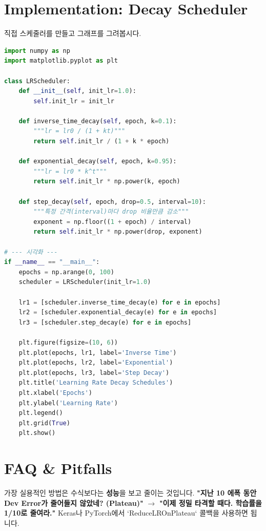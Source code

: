 \documentclass[11pt,a4paper]{book}
\theoremstyle{definition}
\begin{document}
\section{Implementation: Decay Scheduler}

직접 스케줄러를 만들고 그래프를 그려봅시다.

\begin{lstlisting}[language=Python, caption=Learning Rate Schedulers, breaklines=true]
import numpy as np
import matplotlib.pyplot as plt

class LRScheduler:
    def __init__(self, init_lr=1.0):
        self.init_lr = init_lr
        
    def inverse_time_decay(self, epoch, k=0.1):
        """lr = lr0 / (1 + kt)"""
        return self.init_lr / (1 + k * epoch)
        
    def exponential_decay(self, epoch, k=0.95):
        """lr = lr0 * k^t"""
        return self.init_lr * np.power(k, epoch)
        
    def step_decay(self, epoch, drop=0.5, interval=10):
        """특정 간격(interval)마다 drop 비율만큼 감소"""
        exponent = np.floor((1 + epoch) / interval)
        return self.init_lr * np.power(drop, exponent)

# --- 시각화 ---
if __name__ == "__main__":
    epochs = np.arange(0, 100)
    scheduler = LRScheduler(init_lr=1.0)
    
    lr1 = [scheduler.inverse_time_decay(e) for e in epochs]
    lr2 = [scheduler.exponential_decay(e) for e in epochs]
    lr3 = [scheduler.step_decay(e) for e in epochs]
    
    plt.figure(figsize=(10, 6))
    plt.plot(epochs, lr1, label='Inverse Time')
    plt.plot(epochs, lr2, label='Exponential')
    plt.plot(epochs, lr3, label='Step Decay')
    plt.title('Learning Rate Decay Schedules')
    plt.xlabel('Epochs')
    plt.ylabel('Learning Rate')
    plt.legend()
    plt.grid(True)
    plt.show()
\end{lstlisting}

\section{FAQ \& Pitfalls}

\begin{tipbox}[title={ReduceLROnPlateau (실전 꿀팁)}]
가장 실용적인 방법은 수식보다는 \textbf{성능}을 보고 줄이는 것입니다.
\textbf{"지난 10 에폭 동안 Dev Error가 줄어들지 않았네? (Plateau)"} $\rightarrow$ \textbf{"이제 정밀 타격할 때다. 학습률을 1/10로 줄여라."}
Keras나 PyTorch에서 `ReduceLROnPlateau` 콜백을 사용하면 됩니다.
\end{tipbox}
\end{document}

